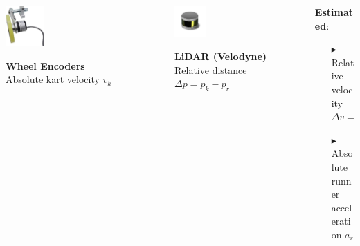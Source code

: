 \documentclass[9pt, aspectratio=169]{beamer}
\begin{document}
\begin{frame}[t]
\vspace{0.1cm}
\begin{columns}
\begin{column}{0.3\textwidth}
	\begin{center}
  		\includegraphics[width=0.25\textwidth]{Wheel_Encoder} 
	\end{center}
\centering
\textbf{Wheel Encoders} \\
Absolute kart velocity $v_k$
\end{column}

\begin{column}{0.3\textwidth}
	\begin{center}
  		\includegraphics[width=0.25\textwidth]{Lidar} 
	\end{center}
\centering
\textbf{LiDAR (Velodyne)} \\
Relative distance $\Delta p = p_k - p_r$
\end{column}

\begin{column}{0.4\textwidth}
\hspace{1.5cm} \textbf{Estimated}:
\begin{itemize}
	\footnotesize
	\item[$\blacktriangleright$] Relative velocity  $\Delta v = v_k - v_r$
	\item[$\blacktriangleright$] Absolute runner acceleration  $a_r$
\end{itemize}
\end{column}
\end{columns}
\end{frame}
\end{document}
